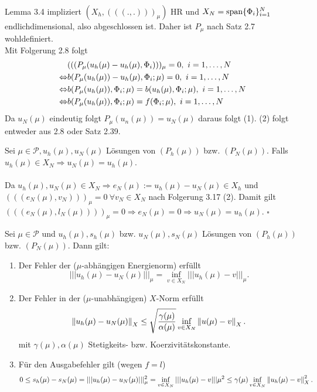 \\
Lemma 3.4 impliziert $(X_h, (((.,.)))_\mu)$ HR und $X_N = \operatorname{span}\{\Phi_i \}_{i=1}^N$ endlichdimensional, also abgeschlossen ist. 
Daher ist $P_\mu$ nach Satz 2.7 wohldefiniert.\\
Mit Folgerung 2.8 folgt
\begin{align*}
&(((P_\mu(u_h(\mu)-u_h(\mu),\Phi_i)))_\mu = 0,~i=1, \dots ,N\\
\Leftrightarrow &b(P_\mu(u_h(\mu))-u_h(\mu),\Phi_i; \mu) = 0,~i=1, \dots ,N\\
\Leftrightarrow &b(P_\mu(u_h(\mu)),\Phi_i; \mu) = b(u_h(\mu),\Phi_i;\mu),~i=1, \dots ,N\\
\Leftrightarrow &b(P_\mu(u_h(\mu)),\Phi_i; \mu) = f(\Phi_i;\mu),~i=1, \dots ,N\\
\end{align*}
Da $u_N(\mu)$ eindeutig folgt $P_\mu(u_n(\mu)) = u_N(\mu)$ daraus folgt (1). (2) folgt entweder aus 2.8 oder Satz 2.39.

Sei $\mu\in\mathcal{P},u_h(\mu),u_N(\mu)$ Lösungen von $(P_h(\mu))$ bzw. $(P_N(\mu))$.
Falls $u_h(\mu)\in X_N \Rightarrow u_N(\mu) = u_h(\mu)$.\\

\\
Da $u_h(\mu),u_N(\mu)\in X_N \Rightarrow e_N(\mu) := u_h(\mu) - u_N(\mu)\in X_h$ und $(((e_N(\mu),v_N)))_\mu = 0 ~\forall v_N\in X_N$ nach Folgerung 3.17 (2).
Damit gilt $(((e_N(\mu),l_N(\mu))))_\mu = 0 \Rightarrow e_N(\mu) = 0 \Rightarrow u_N(\mu) = u_h(\mu)$.
\hfill $\square$

Sei $\mu \in \mathcal{P}$ und $ u_h(\mu),s_h(\mu)$ bzw. $u_N(\mu),s_N(\mu)$ Lösungen von $(P_h(\mu))$ bzw. $(P_N(\mu))$.
Dann gilt:
\begin{enumerate}[(1)]
	\item Der Fehler der ($\mu$-abhängigen Energienorm) erfüllt
	\[
	|||u_h(\mu)-u_N(\mu)|||_\mu = \inf\limits_{v\in X_N} |||u_h(\mu)-v|||_\mu.
	\]
	\item Der Fehler in der ($\mu$-unabhängigen) $X$-Norm erfüllt
	\[
	\left\Vert u_h(\mu)-u_N(\mu)\right\Vert_X \le \sqrt{\frac{\gamma(\mu)}{\alpha(\mu)}} \inf\limits_{v\in X_N} \left\Vert u(\mu)-v\right\Vert_X.
	\]
	mit $\gamma(\mu),\alpha(\mu)$ Stetigkeits- bzw. Koerzivitätskonstante.
	\item Für den Ausgabefehler gilt (wegen $f=l$)
	\[
	0\le s_h(\mu)-s_N(\mu) = |||u_h(\mu)-u_N(\mu)|||_\mu^2 = \inf\limits_{v\in X_N} |||u_h(\mu)-v|||\mu^2 \le \gamma(\mu) \inf\limits_{v\in X_N} \left\Vert u_h(\mu)-v\right\Vert_X^2.
	\]
\end{enumerate}

